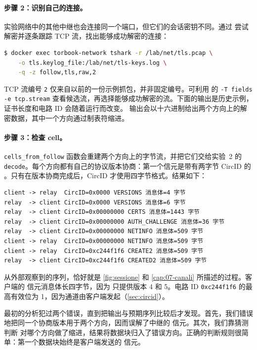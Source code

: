 \paragraph{步骤 2：识别自己的连接。}实验网络中的其他中继也会连接同一个端口，但它们的会话密钥不同。通过  尝试解密并逐条跟踪 TCP 流，找出能够成功解密的连接：
\begin{lstlisting}[language=bash,numbers=none]
$ docker exec torbook-network tshark -r /lab/net/tls.pcap \
    -o tls.keylog_file:/lab/net/tls-keys.log \
    -q -z follow,tls,raw,2
\end{lstlisting}
TCP 流编号 \texttt{2} 仅来自以前的一份示例抓包，并非固定编号。可利用  的 \texttt{-T fields -e tcp.stream} 查看候选流，再选择能够成功解密的流。下面的输出是历史示例，证书长度和电路 ID 会随着运行而改变。
输出会以十六进制给出两个方向上的解密数据，其中一个方向通过制表符缩进。

\paragraph{步骤 3：检查 cell。}\texttt{cells\_from\_follow} 函数会重建两个方向上的字节流，并把它们交给实验~2 的 \texttt{decode}。每个方向都有自己的协议版本协商：第一个信元是带有两字节 CircID 的 。只有在版本协商完成后，CircID 才使用四字节格式。结果如下：
\begin{lstlisting}[numbers=none]
client -> relay  CircID=0x0000 VERSIONS 消息体=4 字节
relay  -> client CircID=0x0000 VERSIONS 消息体=6 字节
relay  -> client CircID=0x00000000 CERTS 消息体=1443 字节
relay  -> client CircID=0x00000000 AUTH_CHALLENGE 消息体=36 字节
relay  -> client CircID=0x00000000 NETINFO 消息体=509 字节
client -> relay  CircID=0x00000000 NETINFO 消息体=509 字节
client -> relay  CircID=0xc244f1f6 CREATE2 消息体=509 字节
relay  -> client CircID=0xc244f1f6 CREATED2 消息体=509 字节
\end{lstlisting}
从外部观察到的序列，恰好就是 \cref{fig:sessione} 和 \cref{cap:07-canali} 所描述的过程。客户端的  信元消息体长四字节，因为  只提供版本 4 和 5。电路 ID \texttt{0xc244f1f6} 的最高有效位为 1，因为通道由客户端发起（\cref{sec:circid}）。

\begin{attenzione}[初版实验中的两个错误]
最初的分析犯过两个错误，直到把输出与预期序列比较后才发现。首先，我们错误地把同一个协商版本用于两个方向，因而误解了中继的  信元。其次，我们靠猜测判断  对哪个方向做了缩进，结果将数据块归入了错误方向。正确的判断规则很简单：第一个数据块始终是客户端发送的  信元。
\end{attenzione}

